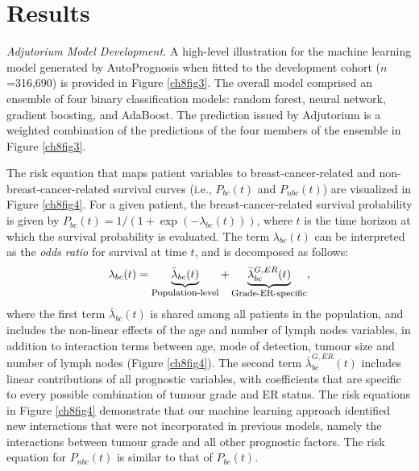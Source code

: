 \documentclass [PhD] {uclathes}
\begin{document}
\section{Results}
\label{ch8sec4}

\textit{Adjutorium Model Development.} A high-level illustration for the machine learning model generated by AutoPrognosis when fitted to the development cohort ($n$=316,690) is provided in Figure \ref{ch8fig3}. The overall model comprised an ensemble of four binary classification models\cite{kotsiantis2007supervised}: random forest, neural network, gradient boosting, and AdaBoost. The prediction issued by Adjutorium is a weighted combination of the predictions of the four members of the ensemble in Figure \ref{ch8fig3}.

The risk equation that maps patient variables to breast-cancer-related and non-breast-cancer-related survival curves (i.e., $P_{bc}(t)$ and $P_{nbc}(t)$) are visualized in Figure \ref{ch8fig4}. For a given patient, the breast-cancer-related survival probability is given by $P_{bc}(t) = 1/(1 + \exp(-\lambda_{bc}(t)))$, where $t$ is the time horizon at which the survival probability is evaluated. The term $\lambda_{bc}(t)$ can be interpreted as the {\it odds ratio} for survival at time $t$, and is decomposed as follows:
\[\lambda_{bc}(t) = \underbrace{\bar{\lambda}_{bc}(t)}_{\mbox{\footnotesize Population-level}} + \underbrace{\bar{\lambda}^{G, ER}_{bc}(t)}_{\mbox{\footnotesize Grade-ER-specific}},\]
where the first term $\bar{\lambda}_{bc}(t)$ is shared among all patients in the population, and includes the non-linear effects of the age and number of lymph nodes variables, in addition to interaction terms between age, mode of detection, tumour size and number of lymph nodes (Figure \ref{ch8fig4}). The second term $\bar{\lambda}^{G, ER}_{bc}(t)$ includes linear contributions of all prognostic variables, with coefficients that are specific to every possible combination of tumour grade and ER status. The risk equations in Figure \ref{ch8fig4} demonstrate that our machine learning approach identified new interactions that were not incorporated in previous models\cite{dos2017updated}, namely the interactions between tumour grade and all other prognostic factors. The risk equation for $P_{nbc}(t)$ is similar to that of $P_{bc}(t)$.
\end{document}

